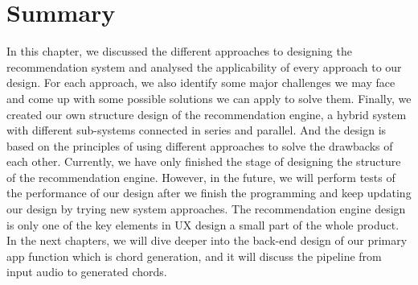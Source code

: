 \section{Summary}
In this chapter, we discussed the different approaches to designing the recommendation system and analysed the applicability of every approach to our design. For each approach, we also identify some major challenges we may face and come up with some possible solutions we can apply to solve them.
Finally, we created our own structure design of the recommendation engine, a hybrid system with different sub-systems connected in series and parallel. 
And the design is based on the principles of using different approaches to solve the drawbacks of each other. Currently, we have only finished the stage of designing the structure of the recommendation engine. 
However, in the future, we will perform tests of the performance of our design after we finish the programming and keep updating our design by trying new system approaches. 
The recommendation engine design is only one of the key elements in UX design a small part of the whole product. In the next chapters, we will dive deeper into the back-end design of our primary app function which is chord generation, and it will discuss the pipeline from input audio to generated chords.

